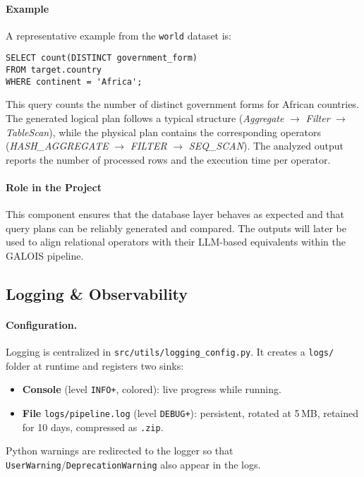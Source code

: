 \documentclass[12pt,a4paper]{article}
\begin{document}
\paragraph{Example}
A representative example from the \texttt{world} dataset is:
\begin{verbatim}
SELECT count(DISTINCT government_form)
FROM target.country
WHERE continent = 'Africa';
\end{verbatim}

This query counts the number of distinct government forms for African countries.
The generated logical plan follows a typical structure
(\emph{Aggregate} $\rightarrow$ \emph{Filter} $\rightarrow$ \emph{TableScan}),
while the physical plan contains the corresponding operators
(\emph{HASH\_AGGREGATE} $\rightarrow$ \emph{FILTER} $\rightarrow$
\emph{SEQ\_SCAN}). The analyzed output reports the number of processed rows and
the execution time per operator.

\paragraph{Role in the Project}
This component ensures that the database layer behaves as expected and that
query plans can be reliably generated and compared. The outputs will later be
used to align relational operators with their LLM-based equivalents within the
GALOIS pipeline.

\subsection{Logging \& Observability}
\label{subsec:logging-impl}

\paragraph{Configuration.}
Logging is centralized in \texttt{src/utils/logging\_config.py}. It creates a \texttt{logs/} folder at runtime and registers two sinks:
\begin{itemize}
  \item \textbf{Console} (level \texttt{INFO+}, colored): live progress while running.
  \item \textbf{File} \texttt{logs/pipeline.log} (level \texttt{DEBUG+}): persistent, rotated at 5\,MB, retained for 10 days, compressed as \texttt{.zip}.
\end{itemize}
Python warnings are redirected to the logger so that \texttt{UserWarning}/\texttt{DeprecationWarning} also appear in the logs.
\end{document}
